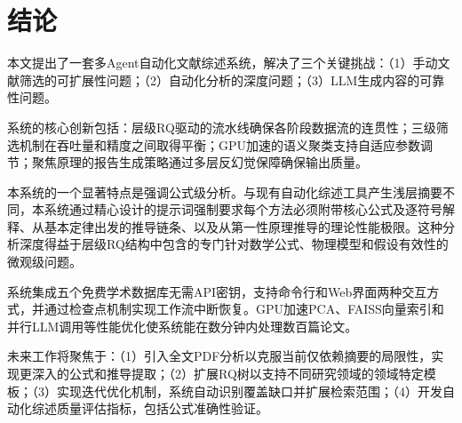 \section{结论}
\label{sec:concl}

本文提出了一套多Agent自动化文献综述系统，解决了三个关键挑战：（1）手动文献筛选的可扩展性问题；（2）自动化分析的深度问题；（3）LLM生成内容的可靠性问题。

系统的核心创新包括：层级RQ驱动的流水线确保各阶段数据流的连贯性；三级筛选机制在吞吐量和精度之间取得平衡；GPU加速的语义聚类支持自适应参数调节；聚焦原理的报告生成策略通过多层反幻觉保障确保输出质量。

本系统的一个显著特点是强调公式级分析。与现有自动化综述工具产生浅层摘要不同，本系统通过精心设计的提示词强制要求每个方法必须附带核心公式及逐符号解释、从基本定律出发的推导链条、以及从第一性原理推导的理论性能极限。这种分析深度得益于层级RQ结构中包含的专门针对数学公式、物理模型和假设有效性的微观级问题。

系统集成五个免费学术数据库无需API密钥，支持命令行和Web界面两种交互方式，并通过检查点机制实现工作流中断恢复。GPU加速PCA、FAISS向量索引和并行LLM调用等性能优化使系统能在数分钟内处理数百篇论文。

未来工作将聚焦于：（1）引入全文PDF分析以克服当前仅依赖摘要的局限性，实现更深入的公式和推导提取；（2）扩展RQ树以支持不同研究领域的领域特定模板；（3）实现迭代优化机制，系统自动识别覆盖缺口并扩展检索范围；（4）开发自动化综述质量评估指标，包括公式准确性验证。
